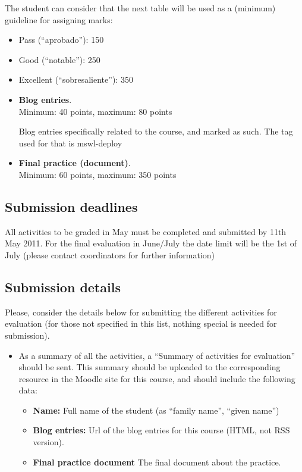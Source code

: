 \documentclass[a4paper]{article}
\begin{document}
The student can consider that the next table will be used as a
(minimum) guideline for assigning marks:

\begin{itemize}
\item Pass (``aprobado''): 150
\item Good (``notable''): 250
\item Excellent (``sobresaliente''): 350
\end{itemize}

\begin{itemize}
\item \textbf{Blog entries}. \\
  Minimum: 40 points, maximum: 80 points

  Blog entries specifically related to the course, and marked as such. The tag used for that is mswl-deploy


\item \textbf{Final practice (document)}. \\
  Minimum: 60 points, maximum: 350 points



\end{itemize}

\subsection{Submission deadlines}

All activities to be graded in May must be completed and submitted by 11th May 2011. For the final evaluation in June/July the date limit will be the 1st of July (please contact coordinators for further information)

\subsection{Submission details}

Please, consider the details below for submitting the different activities for evaluation (for those not specified in this list, nothing special is needed for submission).

\begin{itemize}
\item As a summary of all the activities, a ``Summary of activities for evaluation'' should be sent. This summary should be uploaded to the corresponding resource in the Moodle site for this course, and should include the following data:
  \begin{itemize}
  \item \textbf{Name:} Full name of the student (as ``family name'', ``given name'')
  \item \textbf{Blog entries:} Url of the blog entries for this course (HTML, not RSS version).
  \item \textbf{Final practice document} The final document about the practice.  
  \end{itemize}
\end{itemize}
\end{document}
